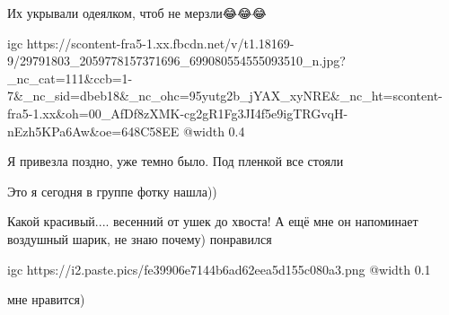  
 
 
 
 

\qqSecCmt


Их укрывали одеялком, чтоб не мерзли😂😂😂

\ifcmt
  igc https://scontent-fra5-1.xx.fbcdn.net/v/t1.18169-9/29791803_2059778157371696_699080554555093510_n.jpg?_nc_cat=111&ccb=1-7&_nc_sid=dbeb18&_nc_ohc=95yutg2b_jYAX_xyNRE&_nc_ht=scontent-fra5-1.xx&oh=00_AfDf8zXMK-cg2gR1Fg3JI4f5e9igTRGvqH-nEzh5KPa6Aw&oe=648C58EE
	@width 0.4
\fi

\begin{itemize} %

Я привезла поздно, уже темно было. Под пленкой все стояли


Это я сегодня в группе фотку нашла))


Какой красивый.... весенний от ушек до хвоста! А ещё мне он напоминает
воздушный шарик, не знаю почему) понравился

\end{itemize} %


\ifcmt
  igc https://i2.paste.pics/fe39906e7144b6ad62eea5d155c080a3.png
	@width 0.1
\fi


мне нравится)

